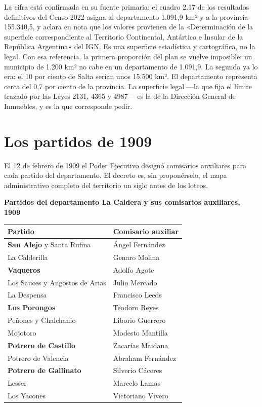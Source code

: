 \begin{cautela}
La cifra está confirmada en su fuente primaria: el cuadro 2.17 de los resultados definitivos del Censo 2022 asigna al departamento 1.091,9 km² y a la provincia 155.340,5, y aclara en nota que los valores provienen de la «Determinación de la superficie correspondiente al Territorio Continental, Antártico e Insular de la República Argentina» del IGN. Es una superficie estadística y cartográfica, no la legal. 
Con esa referencia, la primera proporción del plan se vuelve imposible: un municipio de 1.200 km² no cabe en un departamento de 1.091,9. La segunda ya lo era: el 10 por ciento de Salta serían unos 15.500 km². El departamento representa cerca del 0,7 por ciento de la provincia. La superficie legal ---la que fija el límite trazado por las Leyes 2131, 4365 y 4987--- es la de la Dirección General de Inmuebles, y es la que corresponde pedir.
\end{cautela}

\section{Los partidos de 1909}

El 12 de febrero de 1909 el Poder Ejecutivo designó comisarios auxiliares para cada
partido del departamento. El decreto es, sin proponérselo, el mapa administrativo completo
del territorio un siglo antes de los loteos.

{\sffamily\bfseries\footnotesize Partidos del departamento La Caldera y sus comisarios auxiliares, 1909\par}
\vspace{0.5em}
{\small
\setlength{\LTpre}{0.6em}\setlength{\LTpost}{1.2em}
\begin{longtable}{@{}ll@{}}
\toprule
\textbf{Partido} & \textbf{Comisario auxiliar} \\
\midrule
\endhead
\textbf{San Alejo} y Santa Rufina & Ángel Fernández\index{Fernández, Ángel} \\
La Calderilla & Genaro Molina\index{Molina, Genaro} \\
\textbf{Vaqueros} & Adolfo Agote \\
Los Sauces y Angostos de Arias & Julio Mercado \\
La Despensa & Francisco Leeds \\
\textbf{Los Porongos} & Teodoro Reyes \\
Peñones y Chalchanio & Liborio Guerrero\index{Guerrero, Liborio} \\
Mojotoro & Modesto Mantilla \\
\textbf{Potrero de Castillo} & Zacarías Maidana \\
Potrero de Valencia & Abraham Fernández \\
\textbf{Potrero de Gallinato} & Silverio Cáceres \\
Lesser & Marcelo Lamas \\
Los Yacones & Victoriano Vivero \\
\bottomrule
\end{longtable}
}

